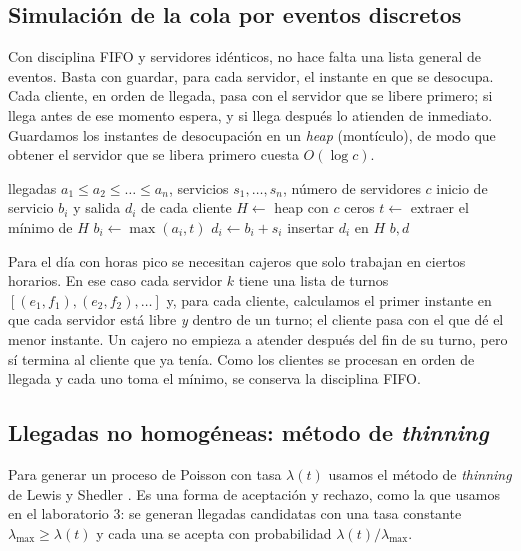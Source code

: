 \documentclass[11pt,letterpaper]{article}
\begin{document}
\subsection{Simulación de la cola por eventos discretos}
Con disciplina FIFO y servidores idénticos, no hace falta una lista general de eventos.
Basta con guardar, para cada servidor, el instante en que se desocupa. Cada cliente, en
orden de llegada, pasa con el servidor que se libere primero; si llega antes de ese
momento espera, y si llega después lo atienden de inmediato. Guardamos los instantes de
desocupación en un \emph{heap} (montículo), de modo que obtener el servidor que se libera
primero cuesta $O(\log c)$.

\begin{algorithm}[H]
\caption{Simulación de una cola FIFO con $c$ servidores}
\label{alg:cola}
\begin{algorithmic}[1]
\Require llegadas $a_1 \le a_2 \le \dots \le a_n$, servicios $s_1,\dots,s_n$, número de servidores $c$
\Ensure inicio de servicio $b_i$ y salida $d_i$ de cada cliente
\State $H \gets$ heap con $c$ ceros 
  \State $t \gets$ extraer el mínimo de $H$
  \State $b_i \gets \max(a_i, t)$ 
  \State $d_i \gets b_i + s_i$
  \State insertar $d_i$ en $H$
\EndFor
\State \Return $b, d$
\end{algorithmic}
\end{algorithm}

Para el día con horas pico se necesitan cajeros que solo trabajan en ciertos horarios.
En ese caso cada servidor $k$ tiene una lista de turnos $[(e_1,f_1),(e_2,f_2),\dots]$ y,
para cada cliente, calculamos el primer instante en que cada servidor está libre
\emph{y} dentro de un turno; el cliente pasa con el que dé el menor instante. Un cajero no
empieza a atender después del fin de su turno, pero sí termina al cliente que ya tenía.
Como los clientes se procesan en orden de llegada y cada uno toma el mínimo, se conserva
la disciplina FIFO.

\subsection{Llegadas no homogéneas: método de \emph{thinning}}
Para generar un proceso de Poisson con tasa $\lambda(t)$ usamos el método de
\emph{thinning} de Lewis y Shedler \cite{lewis}. Es una forma de aceptación y rechazo,
como la que usamos en el laboratorio 3: se generan llegadas candidatas con una tasa
constante $\lambda_{\max} \ge \lambda(t)$ y cada una se acepta con probabilidad
$\lambda(t)/\lambda_{\max}$.
\end{document}
